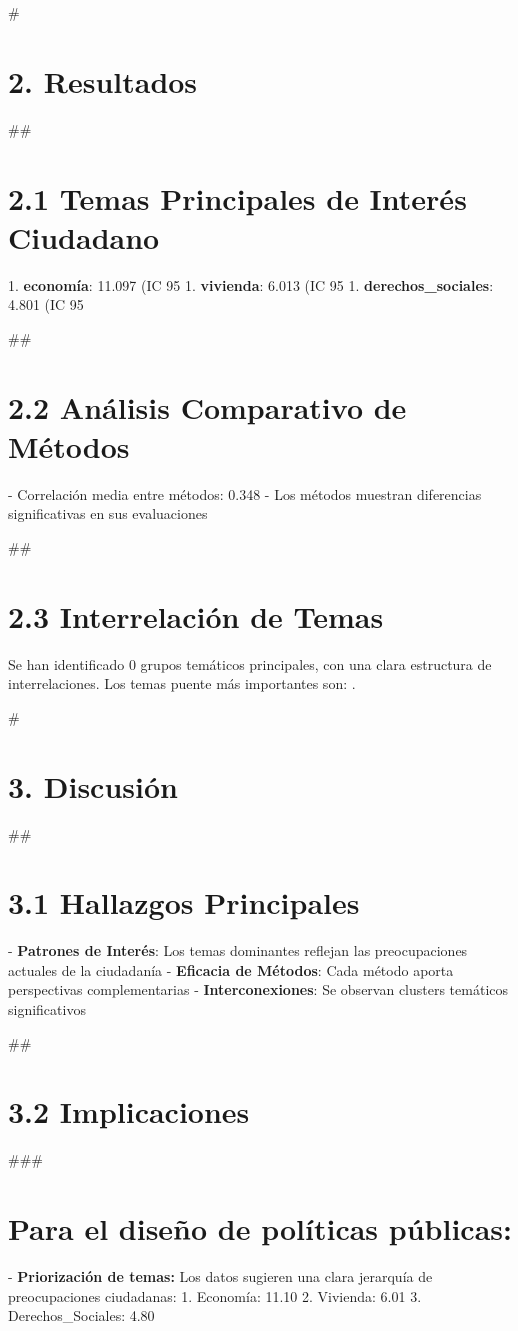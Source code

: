 \documentclass[12pt,a4paper]{article}
\begin{document}
            #\section{2. Resultados}

            ##\section{2.1 Temas Principales de Interés Ciudadano}
            1. \textbf{economía}: 11.097 (IC 95%
1. \textbf{vivienda}: 6.013 (IC 95%
1. \textbf{derechos_sociales}: 4.801 (IC 95%

            ##\section{2.2 Análisis Comparativo de Métodos}
            - Correlación media entre métodos: 0.348
            - Los métodos muestran diferencias significativas en sus evaluaciones

            ##\section{2.3 Interrelación de Temas}
            Se han identificado 0 grupos temáticos principales, con una clara estructura de interrelaciones.
            Los temas puente más importantes son: .

            #\section{3. Discusión}

            ##\section{3.1 Hallazgos Principales}
            - \textbf{Patrones de Interés}: Los temas dominantes reflejan las preocupaciones actuales de la ciudadanía
            - \textbf{Eficacia de Métodos}: Cada método aporta perspectivas complementarias
            - \textbf{Interconexiones}: Se observan clusters temáticos significativos
            
            
            ##\section{3.2 Implicaciones}

            ###\section{Para el diseño de políticas públicas:}
            - \textbf{Priorización de temas:} Los datos sugieren una clara jerarquía de preocupaciones ciudadanas:  1. Economía: 11.10
  2. Vivienda: 6.01
  3. Derechos_Sociales: 4.80
\end{document}
